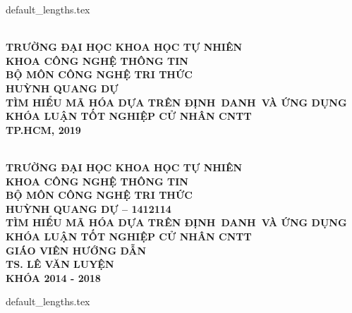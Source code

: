 \documentclass[class=report, crop=false]{standalone}
\begin{document}
	{default_lengths.tex}
	\linespread{1}
	\setsansfont{Tahoma}
	\hypertarget{titlepage}{}
	\begin{titlepage}
		\thisfancypage{%
		\fbox}{}
		
		\begin{center}
			\leavevmode \\[\baselineskip]
			\sffamily\fontsize{13pt}{24pt}\selectfont\bfseries
			TRƯỜNG ĐẠI HỌC KHOA HỌC TỰ NHIÊN \\
			KHOA CÔNG NGHỆ THÔNG TIN \\
			BỘ MÔN CÔNG NGHỆ TRI THỨC \\[2.5cm]
			\rmfamily\Large
			HUỲNH QUANG DỰ \\[2.5cm]
			\sffamily\fontsize{20pt}{30pt}\selectfont
			TÌM HIỂU MÃ HÓA DỰA TRÊN ĐỊNH~DANH~VÀ ỨNG DỤNG \\[1.5cm]
			\rmfamily\large
			KHÓA LUẬN TỐT NGHIỆP CỬ NHÂN CNTT \\[8.5cm]
			\sffamily\fontsize{13pt}{16.8pt}\selectfont
			TP.HCM, 2019
		\end{center}
	\end{titlepage}
	\begin{titlepage}
		\thisfancypage{%
		\fbox}{}
		
		\begin{center}
			\leavevmode \\[\baselineskip]
			\sffamily\fontsize{13pt}{24pt}\selectfont\bfseries
			TRƯỜNG ĐẠI HỌC KHOA HỌC TỰ NHIÊN \\
			KHOA CÔNG NGHỆ THÔNG TIN \\
			BỘ MÔN CÔNG NGHỆ TRI THỨC \\[2.5cm]
			\rmfamily\Large
			HUỲNH QUANG DỰ -- 1412114 \\[2.5cm]
			\sffamily\fontsize{20pt}{30pt}\selectfont
			TÌM HIỂU MÃ HÓA DỰA TRÊN ĐỊNH~DANH~VÀ ỨNG DỤNG \\[1.5cm]
			\rmfamily\large
			KHÓA LUẬN TỐT NGHIỆP CỬ NHÂN CNTT \\[1.7cm]
			GIÁO VIÊN HƯỚNG DẪN \\[\baselineskip]
			\sffamily\fontsize{13pt}{16.8pt}\selectfont
			TS. LÊ VĂN LUYỆN \\[5cm]
			KHÓA 2014 - 2018
		\end{center}
	\end{titlepage}
	\setsansfont{Latin Modern Sans}
	{default_lengths.tex}
\end{document}
